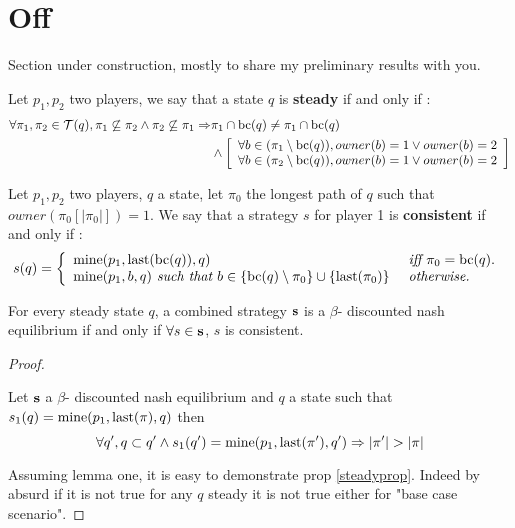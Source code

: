 

\section{Off}

Section under construction, mostly to share my preliminary results with you.

\iffalse

\begin{mydef}
	Let $p_1,p_2$ two players, we say that a state $q$ is \textbf{steady} if and only if : 
	\begin{align*}
		\forall \pi_1,\pi_2 \in \mathcal{T}(q), \pi_1 \not \subseteq \pi_2 \land \pi_2 \not \subseteq \pi_1 \Rightarrow & \pi_1 \cap \text{bc}(q) \neq \pi_1 \cap \text{bc}(q) \\
		& \land \left[
		\begin{array}{ll}
		\forall b \in (\pi_1 \setminus \text{bc}(q)), owner(b) = 1 \lor owner(b) = 2 \\
		\forall b \in (\pi_2 \setminus \text{bc}(q)), owner(b) = 1 \lor owner(b) = 2 \\
		\end{array}\right] \\ 
	\end{align*}
\end{mydef}

\begin{mydef}
	Let $p_1,p_2$ two players, $q$ a state, let $\pi_0$ the longest path of $q$ such that $owner(\pi_0[|\pi_0|]) = 1$.
	We say that a strategy $s$ for player 1 is \textbf{consistent} if and only if : 
	$$
	 s(q) = \left\{
	 \begin{array}{ll}
	 \text{\rm mine}(p_1,\text{\rm last}(\text{bc}(q)),q) & \textit{ iff } \pi_0 = \text{bc}(q). \\
	 \text{\rm mine}(p_1,b,q) \textit{ such that } b\in \{\text{bc}(q)\setminus \pi_0\} \cup \{\text{\rm last}(\pi_0)\} & \textit{ otherwise.} \\
	 \end{array}\right. \\ 
	$$
\end{mydef}

\begin{myprop}
	\label{steadyprop}
	For every steady state $q$, a combined strategy $\mathbf{s}$ is a $\beta$- discounted nash equilibrium if and only if $\forall s \in \mathbf{s}$, $s$ is consistent.
\end{myprop}

\begin{proof}
	\begin{mylem}
		Let $\mathbf{s}$ a $\beta$- discounted nash equilibrium and $q$ a state such that $s_1(q) = \text{\rm mine}(p_1,\text{\rm last}(\pi),q)$ then $$\forall q', q \subset q' \land s_1(q') =  \text{\rm mine}(p_1,\text{\rm last}(\pi'),q') \Rightarrow |\pi'| > |\pi|$$
	\end{mylem}
	Assuming lemma one, it is easy to demonstrate prop \ref{steadyprop}. Indeed by absurd if it is not true for any $q$ steady it is not true either for "base case scenario".
\end{proof}

